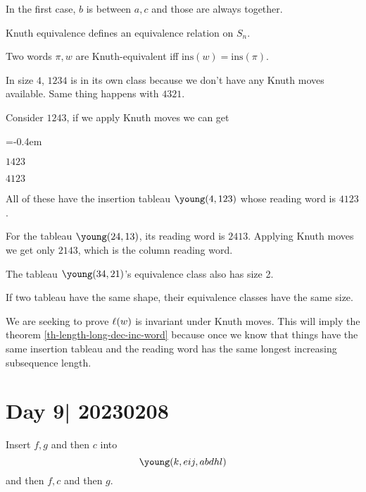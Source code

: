 \documentclass[12pt]{memoir}
\begin{document}
In the first case, $b$ is between $a,c$ and those are always together.

\begin{Prop}
    Knuth equivalence defines an equivalence relation on $S_n$. 
\end{Prop}

\begin{Th}
    Two words $\pi,w$ are Knuth-equivalent iff $\text{ins}(w)=\text{ins}(\pi)$.
\end{Th}

\begin{Ex}
    In size $4$, $1234$ is in its own class because we don't have any Knuth moves available. Same thing happens with $4321$.\par 
    Consider $1243$, if we apply Knuth moves we can get 
    \begin{itemize}
        \begin{multicols}{2}
            \itemsep=-0.4em
            \item $1423$
            \item $4123$
        \end{multicols}
    \end{itemize}
    All of these have the insertion tableau $\young(4,123)$ whose reading word is $4123$.\par 
    For the tableau $\young(24,13)$, its reading word is $2413$. Applying Knuth moves we get only $2143$, which is the column reading word.\par 
    The tableau $\young(34,21)$'s equivalence class also has size 2. 
\end{Ex}

\begin{Prop}
    If two tableau have the same shape, their equivalence classes have the same size. 
\end{Prop}

We are seeking to prove $\ell(w)$ is invariant under Knuth moves. This will imply the theorem \ref{th-length-long-dec-inc-word} because once we know that things have the same insertion tableau and the reading word has the same longest increasing subsequence length.

\section{Day 9| 20230208}

\begin{Ej}
    Insert $f,g$ and then $c$ into 
    $$\young(k,eij,abdhl)$$
    and then $f,c$ and then $g$.
\end{Ej}
\end{document}
